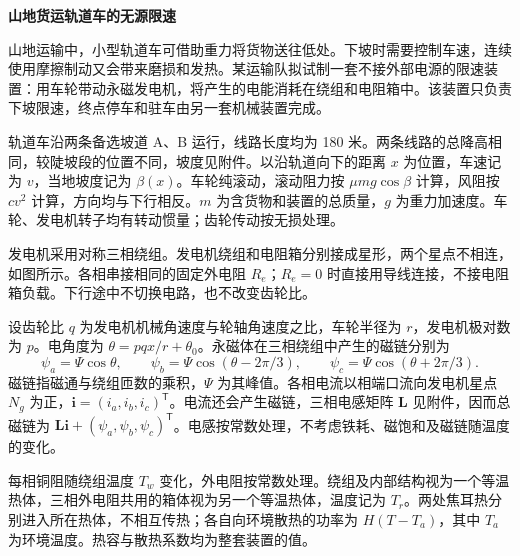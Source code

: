 \documentclass[11pt,a4paper]{article}
\begin{document}
\begin{center}{\LARGE\bfseries 山地货运轨道车的无源限速}\end{center}

山地运输中，小型轨道车可借助重力将货物送往低处。下坡时需要控制车速，连续使用摩擦制动又会带来磨损和发热。某运输队拟试制一套不接外部电源的限速装置：用车轮带动永磁发电机，将产生的电能消耗在绕组和电阻箱中。该装置只负责下坡限速，终点停车和驻车由另一套机械装置完成。

轨道车沿两条备选坡道 A、B 运行，线路长度均为 180 米。两条线路的总降高相同，较陡坡段的位置不同，坡度见附件。以沿轨道向下的距离 $x$ 为位置，车速记为 $v$，当地坡度记为 $\beta(x)$。车轮纯滚动，滚动阻力按 $\mu m g\cos\beta$ 计算，风阻按 $c v^2$ 计算，方向均与下行相反。$m$ 为含货物和装置的总质量，$g$ 为重力加速度。车轮、发电机转子均有转动惯量；齿轮传动按无损处理。

发电机采用对称三相绕组。发电机绕组和电阻箱分别接成星形，两个星点不相连，如图所示。各相串接相同的固定外电阻 $R_e$；$R_e=0$ 时直接用导线连接，不接电阻箱负载。下行途中不切换电路，也不改变齿轮比。

\begin{center}
\end{center}

设齿轮比 $q$ 为发电机机械角速度与轮轴角速度之比，车轮半径为 $r$，发电机极对数为 $p$。电角度为 $\theta=pqx/r+\theta_0$。永磁体在三相绕组中产生的磁链分别为
\[
\psi_a=\Psi\cos\theta,\qquad
\psi_b=\Psi\cos(\theta-2\pi/3),\qquad
\psi_c=\Psi\cos(\theta+2\pi/3).
\]
磁链指磁通与绕组匝数的乘积，$\Psi$ 为其峰值。各相电流以相端口流向发电机星点 $N_g$ 为正，$\boldsymbol i=(i_a,i_b,i_c)^{\mathsf T}$。电流还会产生磁链，三相电感矩阵 $\boldsymbol L$ 见附件，因而总磁链为 $\boldsymbol L\boldsymbol i+(\psi_a,\psi_b,\psi_c)^{\mathsf T}$。电感按常数处理，不考虑铁耗、磁饱和及磁链随温度的变化。

每相铜阻随绕组温度 $T_w$ 变化，外电阻按常数处理。绕组及内部结构视为一个等温热体，三相外电阻共用的箱体视为另一个等温热体，温度记为 $T_r$。两处焦耳热分别进入所在热体，不相互传热；各自向环境散热的功率为 $H(T-T_a)$，其中 $T_a$ 为环境温度。热容与散热系数均为整套装置的值。
\end{document}
